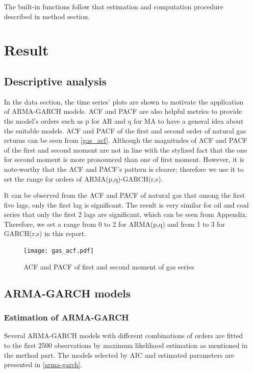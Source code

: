 \documentclass[12pt,a4paper]{article}
\newcommand\colorAutoref[1]{{\hypersetup{linkcolor=black}\autoref{#1}}}
\numberwithin{equation}{section}
\begin{document}
The built-in functions follow that estimation and computation procedure described in method section.
\section{Result}

\subsection{Descriptive analysis}
In the data section, the time series' plots are shown to motivate the application of ARMA-GARCH models. ACF and PACF are also helpful metrics to provide the model’s orders such as p for AR and q for MA to have a general idea about the suitable models. ACF and PACF of the first and second order of natural gas returns can be seen from \colorAutoref{gas_acf}. Although the magnitudes of ACF and PACF of the first and second moment are not in line with the stylized fact that the one for second moment is more pronounced than one of first moment. However, it is note-worthy that the ACF and PACF's pattern is clearer; therefore we use it to set the range for orders of ARMA(p,q)-GARCH(r,s). 

It can be observed from the ACF and PACF of natural gas that among the first five lags, only the first lag is significant. The result is very similar for oil and coal series that only the first 2 lags are significant, which can be seen from Appendix. Therefore, we set a range from 0 to 2 for ARMA(p,q) and from 1 to 3 for GARCH(r,s) in this report. 

\begin{figure}[h!] 
\texttt{[image: gas\_acf.pdf]}
\vspace*{-18mm}
\caption{ACF and PACF of first and second moment of gas series}
\label{gas_acf}
\end{figure}

\subsection{ARMA-GARCH models}

\subsubsection{Estimation of ARMA-GARCH}
Several ARMA-GARCH models with different combinations of orders are fitted to the first 2500 observations by maximum likelihood estimation as mentioned in the method part. The models selected by AIC and estimated parameters are presented in \colorAutoref{arma-garch}. 
\end{document}

